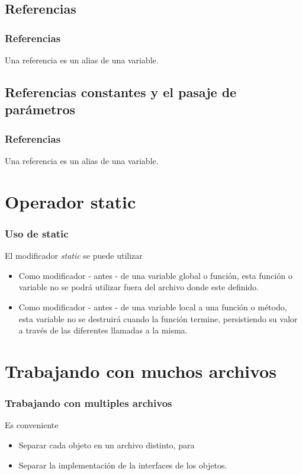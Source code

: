 \documentclass{beamer}
\begin{document}
\subsection{Referencias}
\begin{frame}
\frametitle{Referencias}
  
 Una referencia es un alias de una variable.

\end{frame}

\subsection{Referencias constantes y el pasaje de parámetros}
\begin{frame}
\frametitle{Referencias}
  
 Una referencia es un alias de una variable.

\end{frame}


\section{Operador static}
\begin{frame}
\frametitle{Uso de static}
  El modificador \emph{static} se puede utilizar

\begin{itemize}
 \item Como modificador - antes - de una variable global o función, esta función o variable no se podrá utilizar fuera del archivo donde este definido.
 \item Como modificador - antes - de una variable local a una función o método, esta variable no se destruirá cuando la función termine, persistiendo su valor a través de las diferentes llamadas a la misma.
\end{itemize}
\end{frame}

\section{Trabajando con muchos archivos}

\begin{frame}
\frametitle{Trabajando con multiples archivos}
Es conveniente
\begin{itemize}
 \item Separar cada objeto en un archivo distinto, para 
 \item Separar la implementación de la interfaces de los objetos.
\end{itemize}

\end{frame}
\end{document}
